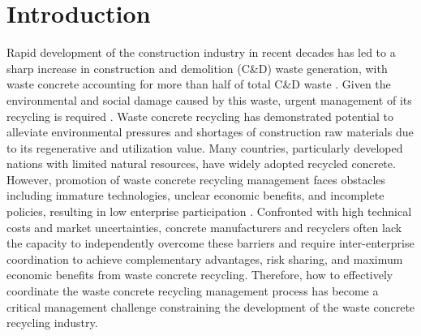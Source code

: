 \documentclass[authoryear,preprint,review,times,10pt]{elsarticle}
\begin{document}
\section{Introduction}
Rapid development of the construction industry in recent decades has led to a sharp increase in construction and demolition (C\&D) waste generation, with waste concrete accounting for more than half of total C\&D waste \cite{zhao2020Use}. Given the environmental and social damage caused by this waste, urgent management of its recycling is required \cite{wu2019Offsite}. Waste concrete recycling has demonstrated potential to alleviate environmental pressures and shortages of construction raw materials due to its regenerative and utilization value. Many countries, particularly developed nations with limited natural resources, have widely adopted recycled concrete. However, promotion of waste concrete recycling management faces obstacles including immature technologies, unclear economic benefits, and incomplete policies, resulting in low enterprise participation \cite{liu2021Explore,ma2020Challenges}. Confronted with high technical costs and market uncertainties, concrete manufacturers and recyclers often lack the capacity to independently overcome these barriers and require inter-enterprise coordination to achieve complementary advantages, risk sharing, and maximum economic benefits from waste concrete recycling. Therefore, how to effectively coordinate the waste concrete recycling management process has become a critical management challenge constraining the development of the waste concrete recycling industry.
\end{document}

